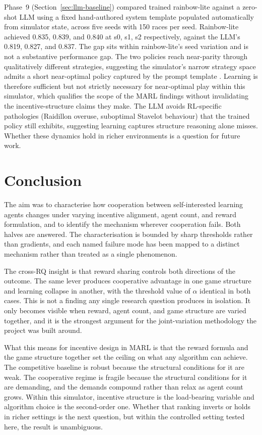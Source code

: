 Phase~9 (Section~\ref{sec:llm-baseline}) compared trained rainbow-lite against a zero-shot LLM using a fixed hand-authored system template populated automatically from simulator state, across five seeds with 150 races per seed. Rainbow-lite achieved 0.835, 0.839, and 0.840 at s0, s1, s2 respectively, against the LLM's 0.819, 0.827, and 0.837. The gap sits within rainbow-lite's seed variation and is not a substantive performance gap. The two policies reach near-parity through qualitatively different strategies, suggesting the simulator's narrow strategy space admits a short near-optimal policy captured by the prompt template \citep{nagpal2025llm_mca}. Learning is therefore sufficient but not strictly necessary for near-optimal play within this simulator, which qualifies the scope of the MARL findings without invalidating the incentive-structure claims they make. The LLM avoids RL-specific pathologies (Raidillon overuse, suboptimal Stavelot behaviour) that the trained policy still exhibits, suggesting learning captures structure reasoning alone misses. Whether these dynamics hold in richer environments is a question for future work.

\section{Conclusion}
\label{sec:conclusion}

The aim was to characterise how cooperation between self-interested learning agents changes under varying incentive alignment, agent count, and reward formulation, and to identify the mechanism wherever cooperation fails. Both halves are answered. The characterisation is bounded by sharp thresholds rather than gradients, and each named failure mode has been mapped to a distinct mechanism rather than treated as a single phenomenon.

The cross-RQ insight is that reward sharing controls both directions of the outcome. The same lever produces cooperative advantage in one game structure and learning collapse in another, with the threshold value of $\alpha$ identical in both cases. This is not a finding any single research question produces in isolation. It only becomes visible when reward, agent count, and game structure are varied together, and it is the strongest argument for the joint-variation methodology the project was built around.

What this means for incentive design in MARL is that the reward formula and the game structure together set the ceiling on what any algorithm can achieve. The competitive baseline is robust because the structural conditions for it are weak. The cooperative regime is fragile because the structural conditions for it are demanding, and the demands compound rather than relax as agent count grows. Within this simulator, incentive structure is the load-bearing variable and algorithm choice is the second-order one. Whether that ranking inverts or holds in richer settings is the next question, but within the controlled setting tested here, the result is unambiguous.

